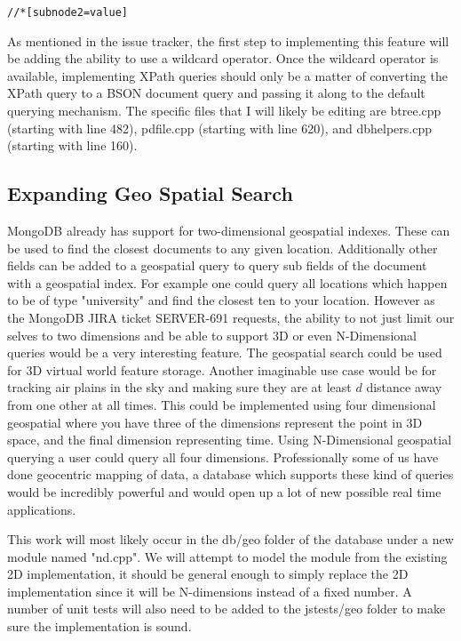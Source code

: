 \documentclass{dependencies/acm_proc_article-sp}
\begin{document}
\begin{center}
\begin{lstlisting}
//*[subnode2=value]
\end{lstlisting}
\end{center}
As mentioned in the issue tracker, the first step to implementing this feature will be adding the ability to use a wildcard operator. Once the wildcard operator is available, implementing XPath queries should only be a matter of converting the XPath query to a BSON document query and passing it along to the default querying mechanism. The specific files that I will likely be editing are btree.cpp (starting with line 482), pdfile.cpp (starting with line 620), and dbhelpers.cpp (starting with line 160).

\subsection{Expanding Geo Spatial Search}
MongoDB already has support for two-dimensional geospatial indexes.
These can be used to find the closest documents to any given location.
Additionally other fields can be added to a geospatial query to query sub fields
of the document with a geospatial index. For example one could query all locations
which happen to be of type "university" and find the closest ten to your location.
However as the MongoDB JIRA ticket SERVER-691\cite{9} requests, the ability to
not just limit our selves to two dimensions and be able to support 3D or even N-Dimensional
queries would be a very interesting feature. The geospatial search could be used for
3D virtual world feature storage. Another imaginable use case would be for tracking air plains
in the sky and making sure they are at least $d$ distance away from one other at all times.
This could be implemented using four dimensional geospatial where you have three of the dimensions
represent the point in 3D space, and the final dimension representing time. Using N-Dimensional
geospatial querying a user could query all four dimensions. Professionally some of us have done geocentric mapping of
data, a database which supports these kind of queries would be incredibly powerful and would open up a lot of new
possible real time applications.

This work will most likely occur in the db/geo folder of the database under a new module named "nd.cpp". We will
attempt to model the module from the existing 2D implementation, it should be general enough to simply replace
the 2D implementation since it will be N-dimensions instead of a fixed number. A number of unit tests will also
need to be added to the jstests/geo folder to make sure the implementation is sound.
\newpage
%

%
%
\balancecolumns
\end{document}
